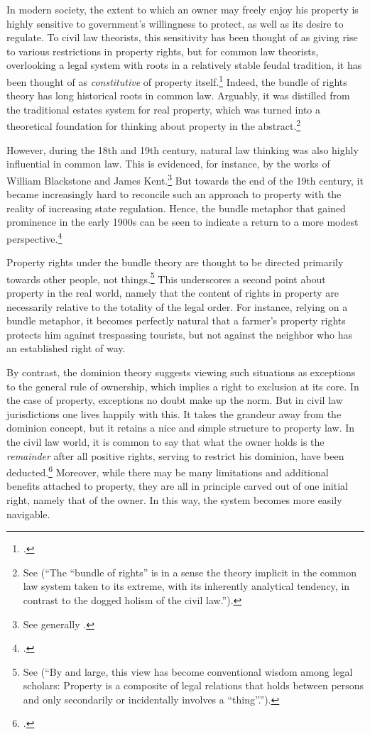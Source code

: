 \documentclass[12pt,a4paper]{book} %
\begin{document}
In modern society, the extent to which an owner may freely enjoy his property is highly sensitive to government's willingness to protect, as well as its desire to regulate. To civil law theorists, this sensitivity has been thought of as giving rise to various restrictions in property rights, but for common law theorists, overlooking a legal system with roots in a relatively stable feudal tradition, it has been thought of as {\it constitutive} of property itself.\footcite[7]{chang12} Indeed, the bundle of rights theory has long historical roots in common law. Arguably, it was distilled from the traditional estates system for real property, which was turned into a theoretical foundation for thinking about property in the abstract.\footnote{See \cite[7]{chang12}   
(``The ``bundle of rights'' is in a sense the theory implicit in the common law system taken to its extreme, with its inherently analytical tendency, in contrast to the dogged holism of the civil law.'').} 

However, during the 18th and 19th century, natural law thinking was also highly influential in common law. This is evidenced, for instance, by the works of William Blackstone and James Kent.\footnote{See generally \cite{blackstone79b,kent27}.} But towards the end of the 19th century, it became increasingly hard to reconcile such an approach to property with the reality of increasing state regulation. Hence, the bundle metaphor that gained prominence in the early 1900s can be seen to indicate a return to a more modest perspective.\footcite[195]{klein11}

Property rights under the bundle theory are thought to be directed primarily towards other people, not things.\footnote{See \cite[357-358]{merrill01} (``By and large, this view has become conventional wisdom among legal scholars: Property is a composite of legal relations that holds between persons and only secondarily or incidentally involves a ``thing''.'').} This underscores a second point about property in the real world, namely that the content of rights in property are necessarily relative to the totality of the legal order. For instance, relying on a bundle metaphor, it becomes perfectly natural that a farmer's property rights protects him against trespassing tourists, but not against the neighbor who has an established right of way. 

By contrast, the dominion theory suggests viewing such situations as exceptions to the general rule of ownership, which implies a right to exclusion at its core. In the case of property, exceptions no doubt make up the norm. But in civil law jurisdictions one lives happily with this. It takes the grandeur away from the dominion concept, but it retains a nice and simple structure to property law. In the civil law world, it is common to say that what the owner holds is the {\it remainder} after all positive rights, serving to restrict his dominion, have been deducted.\footcite[25]{chang12} Moreover, while there may be many limitations and additional benefits attached to property, they are all in principle carved out of one initial right, namely that of the owner. In this way, the system becomes more easily navigable.
\end{document}
